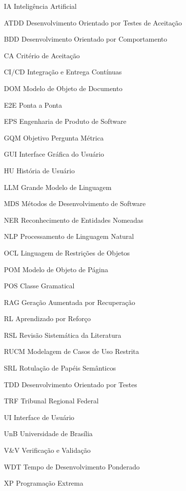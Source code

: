 \begin{siglas}
  \item[IA] Inteligência Artificial
  \item[ATDD] Desenvolvimento Orientado por Testes de Aceitação
  \item[BDD] Desenvolvimento Orientado por Comportamento
  \item[CA] Critério de Aceitação
  \item[CI/CD] Integração e Entrega Contínuas
  \item[DOM] Modelo de Objeto de Documento
  \item[E2E] Ponta a Ponta
  \item[EPS] Engenharia de Produto de Software
  \item[GQM] Objetivo Pergunta Métrica
  \item[GUI] Interface Gráfica do Usuário
  \item[HU] História de Usuário
  \item[LLM] Grande Modelo de Linguagem
  \item[MDS] Métodos de Desenvolvimento de Software
  \item[NER] Reconhecimento de Entidades Nomeadas
  \item[NLP] Processamento de Linguagem Natural
  \item[OCL] Linguagem de Restrições de Objetos
  \item[POM] Modelo de Objeto de Página
  \item[POS] Classe Gramatical
  \item[RAG] Geração Aumentada por Recuperação
  \item[RL] Aprendizado por Reforço
  \item[RSL] Revisão Sistemática da Literatura
  \item[RUCM] Modelagem de Casos de Uso Restrita
  \item[SRL] Rotulação de Papéis Semânticos
  \item[TDD] Desenvolvimento Orientado por Testes
  \item[TRF] Tribunal Regional Federal
  \item[UI] Interface de Usuário
  \item[UnB] Universidade de Brasília
  \item[V\&V] Verificação e Validação
  \item[WDT] Tempo de Desenvolvimento Ponderado
  \item[XP] Programação Extrema
\end{siglas}
